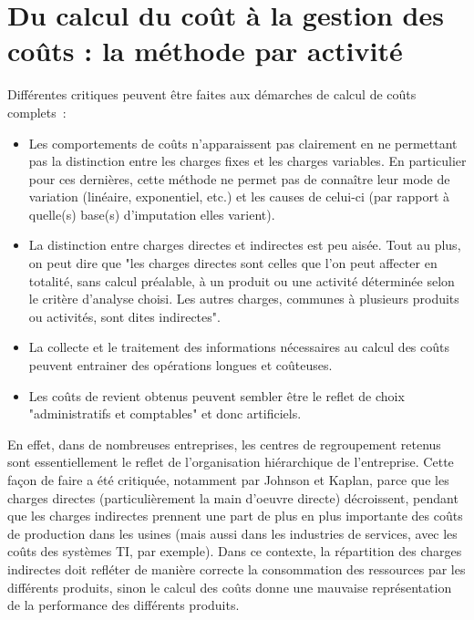 \documentclass[oneside]{kaobook}
\begin{document}
\section{Du calcul du coût à la gestion des coûts : la méthode par activité}
\label{sec:org7412429}
Différentes critiques peuvent être faites aux démarches de calcul de coûts complets :
\begin{itemize}
\item Les comportements de coûts n'apparaissent pas clairement en ne permettant pas la distinction entre les charges fixes et les charges variables. En particulier pour ces dernières, cette méthode ne permet pas de connaître leur mode de variation (linéaire, exponentiel, etc.) et les causes de celui-ci (par rapport à quelle(s) base(s) d'imputation elles varient).
\item La distinction entre charges directes et indirectes est peu aisée. Tout au plus, on peut dire que "les charges directes sont celles que l'on peut affecter en totalité, sans calcul préalable, à un produit ou une activité déterminée selon le critère d'analyse choisi. Les autres charges, communes à plusieurs produits ou activités, sont dites indirectes".
\item La collecte et le traitement des informations nécessaires au calcul des coûts peuvent entrainer des opérations longues et coûteuses.
\item Les coûts de revient obtenus peuvent sembler être le reflet de choix "administratifs et comptables" et donc artificiels.
\end{itemize}

En effet, dans de nombreuses entreprises, les centres de regroupement retenus sont essentiellement le reflet de l'organisation hiérarchique de l'entreprise. Cette façon de faire a été critiquée, notamment par Johnson et Kaplan, parce que les charges directes (particulièrement la main d'oeuvre directe) décroissent, pendant que les charges indirectes prennent une part de plus en plus importante des coûts de production dans les usines (mais aussi dans les industries de services, avec les coûts des systèmes TI, par exemple). Dans ce contexte, la répartition des charges indirectes doit refléter de manière correcte la consommation des ressources par les différents produits, sinon le calcul des coûts donne une mauvaise représentation de la performance des différents produits.
\end{document}
